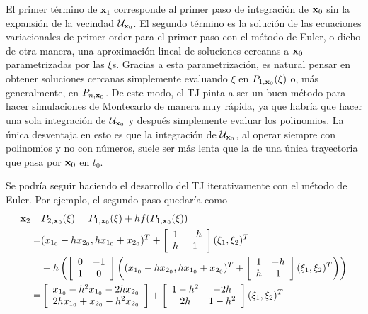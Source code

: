 El primer término de $\mathbf{x}_1$ corresponde al primer paso de integración de $\mathbf{x}_0$ sin la expansión de la vecindad $\mathcal{U}_{\mathbf{x}_0}$. El segundo término es la solución de las ecuaciones variacionales de primer order para el primer paso con el método de Euler, o dicho de otra manera, una aproximación lineal de soluciones cercanas a $\mathbf{x}_0$ parametrizadas por las $\xi$s. Gracias a esta parametrización, es natural pensar en obtener soluciones cercanas simplemente evaluando $\xi$ en $P_{1,\mathbf{x}_0}(\xi)$ o, más generalmente, en $P_{n,\mathbf{x}_0}$. De este modo, el TJ pinta a ser un buen método para hacer simulaciones de Montecarlo de manera muy rápida, ya que habría que hacer una sola integración de $\mathcal{U}_{\mathbf{x}_0}$ y después simplemente evaluar los polinomios. La única desventaja en esto es que la integración de $\mathcal{U}_{\mathbf{x}_0}$, al operar siempre con polinomios y no con números, suele ser más lenta que la de una única trayectoria que pasa por $\mathbf{x}_0$ en $t_0$.

Se podría seguir haciendo el desarrollo del TJ iterativamente con el método de Euler. Por ejemplo, el segundo paso quedaría como 
\begin{align*}
\mathbf{x}_2 =& P_{2,\mathbf{x}_0}(\xi) = P_{1,\mathbf{x}_0}(\xi) + h f(P_{1,\mathbf{x}_0}(\xi)) \\
=& (x_{1_0} - h x_{2_0}, h x_{1_0} + x_{2_0} )^T + \left[ \begin{array}{cc}
 1 & -h  \\
h & 1  \\
\end{array} \right] (\xi_1,\xi_2)^T \\ 
&+ h \left( \left[ \begin{array}{cc}
 0 & -1  \\
 1 &  0  \\
\end{array} \right] \left( (x_{1_0} - h x_{2_0}, h x_{1_0} + x_{2_0} )^T + \left[ \begin{array}{cc}
 1 & -h  \\
h & 1  \\
\end{array} \right] (\xi_1,\xi_2)^T \right) \right) \\
=& \left[ \begin{array}{c}
x_{1_0} - h^2x_{1_0} - 2h x_{2_0}  \\
2h x_{1_0} + x_{2_0}  - h^2x_{2_0}  \\
\end{array} \right] + \left[ \begin{array}{cc}
 1-h^2 & -2h  \\
2h & 1-h^2  \\
\end{array} \right] (\xi_1,\xi_2)^T
\end{align*}
 
